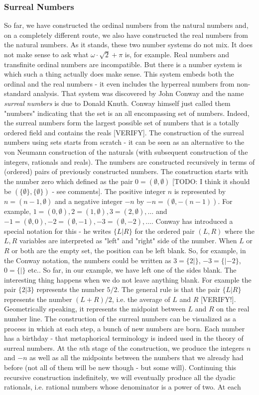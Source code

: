 \subsubsection{Surreal Numbers}
So far, we have constructed the ordinal numbers from the natural numbers and, on a completely different route, we also have constructed the real numbers from the natural numbers. As it stands, these two number systems do not mix. It does not make sense to ask what $\omega \cdot \sqrt{2} + \pi$ is, for example. Real numbers and transfinite ordinal numbers are incompatible. But there is a number system is which such a thing actually does make sense. This system embeds both the ordinal and the real numbers - it even includes the hyperreal numbers from non-standard analysis. That system was discovered by John Conway and the name \emph{surreal numbers} is due to Donald Knuth. Conway himself just called them "numbers" indicating that the set is an all encompassing set of numbers. Indeed, the surreal numbers form the largest possible set of numbers that is a totally ordered field and contains the reals [VERIFY]. The construction of the surreal numbers using sets starts from scratch - it can be seen as an alternative to the von Neumann construction of the naturals (with subsequent construction of the integers, rationals and reals). The numbers are constructed recursively in terms of (ordered) pairs of previously constructed numbers. The construction starts with the number zero which defined as the pair $0 = (\emptyset, \emptyset)$ [TODO: I think it should be $(\{\emptyset\},\{\emptyset\})$ - see comments]. The positive integer $n$ is represented by $n = (n-1,\emptyset)$ and a negative integer $-n$ by $-n = (\emptyset, -(n-1))$. For example, $1=(0,\emptyset), 2=(1,\emptyset), 3=(2,\emptyset), \ldots$ and $-1=(\emptyset,0), -2=(\emptyset,-1), -3=(\emptyset,-2), \ldots$. Conway has introduced a special notation for this - he writes $\{L|R\}$ for the ordered pair $(L,R)$ where the $L,R$ variables are interpreted as "left" and "right" side of the number. When $L$ or $R$ or both are the empty set, the position can be left blank. So, for example, in the Conway notation, the numbers could be written as $3=\{2|\}$, $-3=\{|-2\}$,  $0=\{|\}$ etc.. So far, in our example, we have left one of the sides blank. The interesting thing happens when we do not leave anything blank. For example the pair $\{2|3\}$ represents the number $5/2$. The general rule is that the pair $\{L|R\}$ represents the number $(L+R)/2$, i.e. the average of $L$ and $R$ [VERIFY!]. Geometrically speaking, it represents the midpoint between $L$ and $R$ on the real number line. The construction of the surreal numbers can be visualized as a process in which at each step, a bunch of new numbers are born. Each number has a birthday - that metaphorical terminology is indeed used in the theory of surreal numbers. At the $n$th stage of the construction, we produce the integers $n$ and $-n$ as well as all the midpoints between the numbers that we already had before (not all of them will be new though - but some will). Continuing this recursive construction indefinitely, we will eventually produce all the dyadic rationals, i.e. rational numbers whose denominator is a power of two. At each 